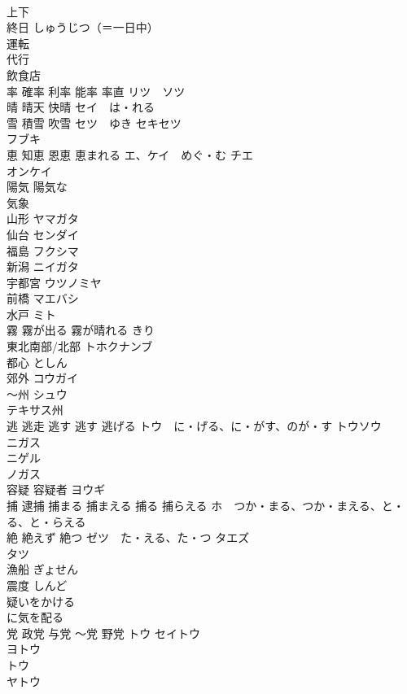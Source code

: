 \documentclass[8pt]{extreport}
\begin{document}
\begin{CJK}{UTF8}{min}
\\	上下	
\\	終日	しゅうじつ（＝一日中） 
\\	運転	
\\	代行	
\\	飲食店	
\\	率 確率 利率 能率 率直	リツ　ソツ 
\\	晴 晴天 快晴	セイ　は・れる 
\\	雪 積雪 吹雪	セツ　ゆき セキセツ
\\	フブキ
\\	恵 知恵 恩恵 恵まれる	エ、ケイ　めぐ・む チエ 
\\	オンケイ 
\\	陽気 陽気な	
\\	気象	
\\	山形	ヤマガタ
\\	仙台	センダイ
\\	福島	フクシマ
\\	新潟	ニイガタ
\\	宇都宮	ウツノミヤ
\\	前橋	マエバシ
\\	水戸	ミト
\\	霧 霧が出る 霧が晴れる	きり 
\\	東北南部/北部	トホクナンブ 
\\	都心	としん 
\\	郊外	コウガイ 
\\	〜州	シュウ 
\\	テキサス州
\\	逃 逃走 逃す 逃す 逃げる	トウ　に・げる、に・がす、のが・す トウソウ 
\\	ニガス　
\\	ニゲル　
\\	ノガス　
\\	容疑 容疑者	ヨウギ 
\\	捕 逮捕 捕まる 捕まえる 捕る 捕らえる	ホ　つか・まる、つか・まえる、と・る、と・らえる 
\\	絶 絶えず 絶つ	ゼツ　た・える、た・つ タエズ 
\\	タツ 
\\	漁船	ぎょせん 
\\	震度	しんど 
\\	疑いをかける	
\\	に気を配る	
\\	党 政党 与党 〜党 野党	トウ セイトウ 
\\	ヨトウ 
\\	トウ　
\\	ヤトウ 

\end{CJK}
\end{document}
